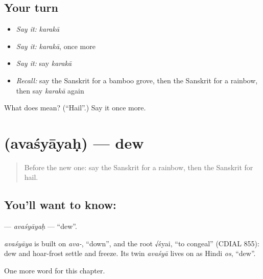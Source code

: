 \subsection*{Your turn}
\begin{itemize}
\raggedright
  \item \emph{Say it:} \emph{karakā}
  \item \emph{Say it:} \emph{karakā}, once more
  \item \emph{Say it:} say \emph{karakā}
  \item \emph{Recall:} say the Sanskrit for a bamboo grove, then the Sanskrit for a rainbow, then say \emph{karakā} again
\end{itemize}

\begin{tcolorbox}[breakable,colback=teal!4,colframe=teal!35!black,title={Before you move on}]
What does  mean? (\textquotedblleft{}Hail\textquotedblright{}.) Say it once more.
\end{tcolorbox}
\section[\texorpdfstring{\sk{अवश्यायः} (avaśyāyaḥ)}{अवश्यायः (avaśyāyaḥ)}]{ (avaśyāyaḥ) — dew}

\label{lesson:SA-C197-avasyayah}



\begin{quote}
Before the new one: say the Sanskrit for a rainbow, then the Sanskrit for hail.
\end{quote}

\subsection*{You'll want to know: }
\textbf{} — \emph{avaśyāyaḥ} — \textquotedblleft{}dew\textquotedblright{}.

\begin{cousinweb}
\emph{avaśyāya} is built on \emph{ava-}, \textquotedblleft{}down\textquotedblright{}, and the root √śyai, \textquotedblleft{}to congeal\textquotedblright{} (CDIAL 855): dew and hoar-frost settle and freeze. Its twin \emph{avaśyā} lives on as Hindi \emph{os}, \textquotedblleft{}dew\textquotedblright{}.
\end{cousinweb}

\begin{grammarlens}[title={What you've built}]
One more word for this chapter.
\end{grammarlens}

